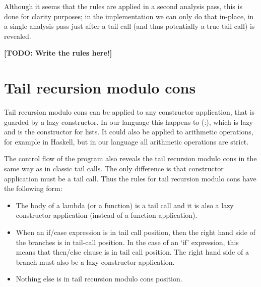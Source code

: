 \documentclass[diploma]{softlab-thesis}
\begin{document}
Although it seems that the rules are applied in a second analysis pass, this is done for clarity purposes; in the implementation we can 
only do that in-place, in a single analysis pass just after a tail call (and thus potentially a true tail call) is revealed.

\textbf{[TODO: Write the rules here!]}

\section{Tail recursion modulo cons}
\label{sec:modulo-cons-analysis}


Tail recursion modulo cons can be applied to any constructor application, that is guarded by a lazy constructor.
In our language this happens to (:), which is lazy and is the constructor for lists. It could also be applied 
to arithmetic operations, for example in Haskell, but in our language all arithmetic operations are strict.

The control flow of the program also reveals the tail recursion modulo cons in the same way as in classic tail 
calls. The only difference is that constructor application must be a tail call. Thus the rules for tail recursion 
modulo cons have the following form:
\begin{itemize} 
  \item The body of a lambda (or a function) is a tail call and it is also a lazy constructor application
  (instead of a function application).
  \item When an if/case expression is in tail call position, then the right hand side of the branches is in tail-call position. 
  In the case of an `if' expression, this means that then/else clause is in tail call position. The right hand side 
  of a branch must also be a lazy constructor application.
  \item Nothing else is in tail recursion modulo cons position.
\end{itemize}

\end{document}
